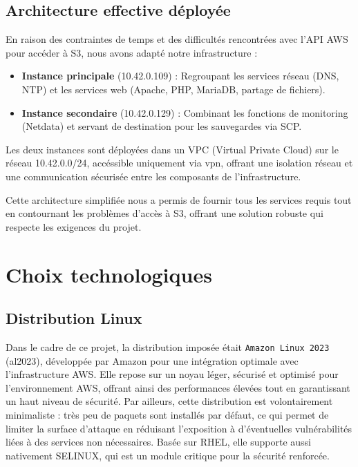 \documentclass[a4paper,12pt]{article}
\begin{document}
\subsection{Architecture effective déployée}

En raison des contraintes de temps et des difficultés rencontrées avec l'API AWS pour accéder à S3, nous avons adapté notre infrastructure :

\begin{itemize}
    \item \textbf{Instance principale} (10.42.0.109) : Regroupant les services réseau (DNS, NTP) et les services web (Apache, PHP, MariaDB, partage de fichiers).
    \item \textbf{Instance secondaire} (10.42.0.129) : Combinant les fonctions de monitoring (Netdata) et servant de destination pour les sauvegardes via SCP.
\end{itemize}

Les deux instances sont déployées dans un VPC (Virtual Private Cloud) sur le réseau 10.42.0.0/24, accéssible uniquement via vpn,  offrant une isolation réseau et une communication sécurisée entre les composants de l'infrastructure.

Cette architecture simplifiée nous a permis de fournir tous les services requis tout en contournant les problèmes d'accès à S3, offrant une solution robuste qui respecte les exigences du projet.

\section{Choix technologiques}

\subsection{Distribution Linux}

Dans le cadre de ce projet, la distribution imposée était \texttt{Amazon Linux 2023} (al2023), développée par Amazon pour une intégration optimale avec l'infrastructure AWS. Elle repose sur un noyau léger, sécurisé et optimisé pour l'environnement AWS, offrant ainsi des performances élevées tout en garantissant un haut niveau de sécurité. Par ailleurs, cette distribution est volontairement minimaliste : très peu de paquets sont installés par défaut, ce qui permet de limiter la surface d'attaque en réduisant l'exposition à d'éventuelles vulnérabilités liées à des services non nécessaires. Basée sur RHEL, elle supporte aussi nativement SELINUX, qui est un module critique pour la sécurité renforcée.
\end{document}
